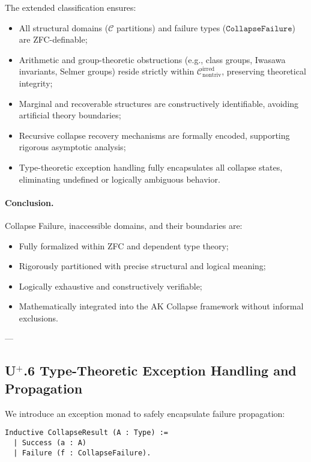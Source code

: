 \documentclass[11pt]{article}
\begin{document}
The extended classification ensures:

\begin{itemize}
    \item All structural domains ($\mathcal{C}$ partitions) and failure types ($\texttt{CollapseFailure}$) are ZFC-definable;
    \item Arithmetic and group-theoretic obstructions (e.g., class groups, Iwasawa invariants, Selmer groups) reside strictly within $\mathcal{C}_{\mathrm{nontriv}}^{\mathrm{irred}}$, preserving theoretical integrity;
    \item Marginal and recoverable structures are constructively identifiable, avoiding artificial theory boundaries;
    \item Recursive collapse recovery mechanisms are formally encoded, supporting rigorous asymptotic analysis;
    \item Type-theoretic exception handling fully encapsulates all collapse states, eliminating undefined or logically ambiguous behavior.
\end{itemize}

\paragraph{Conclusion.}

Collapse Failure, inaccessible domains, and their boundaries are:

\begin{itemize}
    \item Fully formalized within ZFC and dependent type theory;
    \item Rigorously partitioned with precise structural and logical meaning;
    \item Logically exhaustive and constructively verifiable;
    \item Mathematically integrated into the AK Collapse framework without informal exclusions.
\end{itemize}

---

\subsection*{U$^{+}$.6 Type-Theoretic Exception Handling and Propagation}

We introduce an exception monad to safely encapsulate failure propagation:

\begin{lstlisting}[language=Coq]
Inductive CollapseResult (A : Type) :=
  | Success (a : A)
  | Failure (f : CollapseFailure).
\end{lstlisting}
\end{document}
